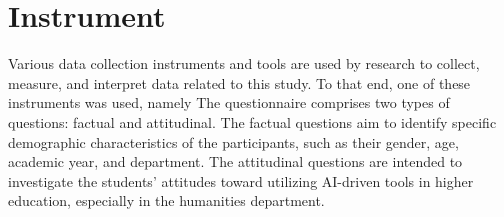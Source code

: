 \begin{Center}
	\begin{figure}
		\centering
	\end{figure}

	\begin{figure}
		\centering
	\end{figure}
\end{Center}
\begin{Center}
	\begin{figure}
		\centering
	\end{figure}

	\begin{figure}
		\centering
	\end{figure}
\end{Center}
\section{Instrument}
\justifying

Various data collection instruments and tools are used by research to collect,
measure, and interpret data related to this study. To that end, one of these
instruments was used, namely  The questionnaire comprises
two types of questions: factual and attitudinal. The factual questions aim to
identify specific demographic characteristics of the participants, such as
their gender, age, academic year, and department. The attitudinal questions
are intended to investigate the students’ attitudes toward utilizing AI-driven
tools in higher education, especially in the humanities department.


